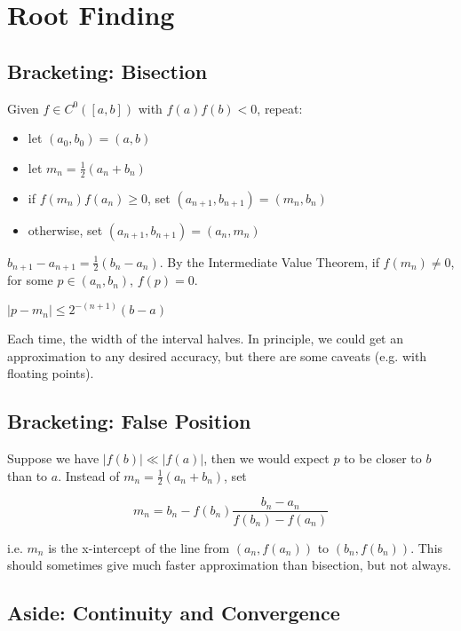 \maketitle
\section{Root Finding}

\subsection{Bracketing: Bisection}

Given $f \in C^0 ([a, b])$ with $f(a) f(b) < 0$, repeat:
\begin{itemize}
	\item let $(a_0, b_0) = (a, b)$
	\item let $m_n = \frac{1}{2} (a_n + b_n)$
	\item if $f(m_n)f(a_n) \ge 0$, set $(a_{n + 1}, b_{n + 1}) = (m_n, b_n)$
	\item otherwise, set $(a_{n + 1}, b_{n + 1}) = (a_n, m_n)$
\end{itemize}

$b_{n + 1} - a_{n + 1} = \frac{1}{2} (b_n - a_n)$. By the Intermediate Value Theorem, if $f(m_n) \ne 0$, for some $p \in (a_n, b_n)$, $f(p) = 0$.

$|p - m_n| \le 2^{-(n + 1)} (b - a)$

\begin{remark}
	Each time, the width of the interval halves. In principle, we could get an approximation to any desired accuracy, but there are some caveats (e.g. with floating points).
\end{remark}

\subsection{Bracketing: False Position}

Suppose we have $|f(b)| \ll |f(a)|$, then we would expect $p$ to be closer to $b$ than to $a$. Instead of $m_n = \frac{1}{2} (a_n + b_n)$, set

\[m_n = b_n - f(b_n) \frac{b_n - a_n}{f(b_n) - f(a_n)}\]

i.e. $m_n$ is the x-intercept of the line from $(a_n, f(a_n))$ to $(b_n, f(b_n))$. This should sometimes give much faster approximation than bisection, but not always.

\subsection{Aside: Continuity and Convergence}

